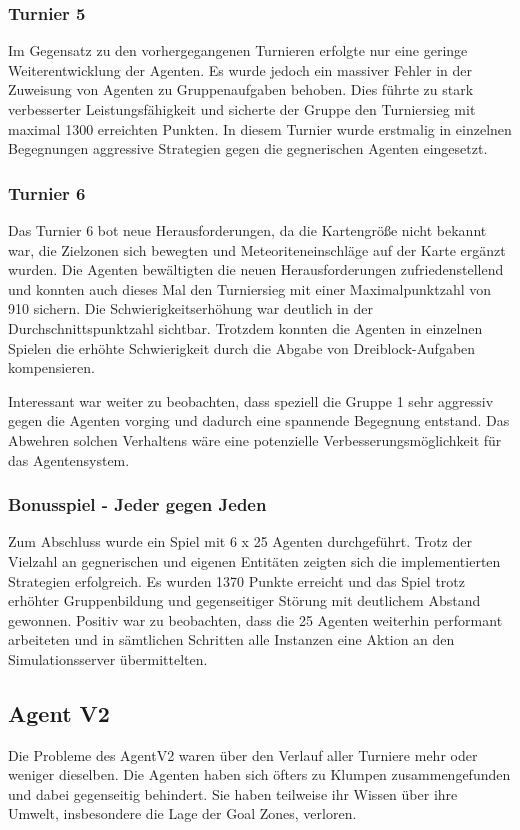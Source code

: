\documentclass[runningheads]{llncs}
\begin{document}
\subsubsection{Turnier 5}
Im Gegensatz zu den vorhergegangenen Turnieren erfolgte nur eine geringe Weiterentwicklung der Agenten. Es wurde jedoch ein massiver Fehler in der Zuweisung von Agenten zu Gruppenaufgaben behoben. Dies führte zu stark verbesserter Leistungsfähigkeit und sicherte der Gruppe den Turniersieg mit maximal 1300 erreichten Punkten. In diesem Turnier wurde erstmalig in einzelnen Begegnungen aggressive Strategien gegen die gegnerischen Agenten eingesetzt.

\subsubsection{Turnier 6}
Das Turnier 6 bot neue Herausforderungen, da die Kartengröße nicht bekannt war, die Zielzonen sich bewegten und Meteoriteneinschläge auf der Karte ergänzt wurden. Die Agenten bewältigten die neuen Herausforderungen zufriedenstellend und konnten auch dieses Mal den Turniersieg mit einer Maximalpunktzahl von 910 sichern. Die Schwierigkeitserhöhung war deutlich in der Durchschnittspunktzahl sichtbar. Trotzdem konnten die Agenten in einzelnen Spielen die erhöhte Schwierigkeit durch die Abgabe von Dreiblock-Aufgaben kompensieren.

Interessant war weiter zu beobachten, dass speziell die Gruppe 1 sehr aggressiv gegen die Agenten vorging und dadurch eine spannende Begegnung entstand. Das Abwehren solchen Verhaltens wäre eine potenzielle Verbesserungsmöglichkeit für das Agentensystem. 

\subsubsection{Bonusspiel - Jeder gegen Jeden}
Zum Abschluss wurde ein Spiel mit 6 x 25 Agenten durchgeführt. Trotz der Vielzahl an gegnerischen und eigenen Entitäten zeigten sich die implementierten Strategien erfolgreich. Es wurden 1370 Punkte erreicht und das Spiel trotz erhöhter Gruppenbildung und gegenseitiger Störung mit deutlichem Abstand gewonnen.
Positiv war zu beobachten, dass die 25 Agenten weiterhin performant arbeiteten und in sämtlichen Schritten alle Instanzen eine Aktion an den Simulationsserver übermittelten.  





\subsection{Agent V2}
Die Probleme des AgentV2 waren über den Verlauf aller Turniere mehr oder weniger dieselben.  Die Agenten haben sich öfters zu Klumpen zusammengefunden und dabei gegenseitig behindert. Sie haben teilweise ihr Wissen über ihre Umwelt, insbesondere die Lage der Goal Zones, verloren. 
\end{document}

